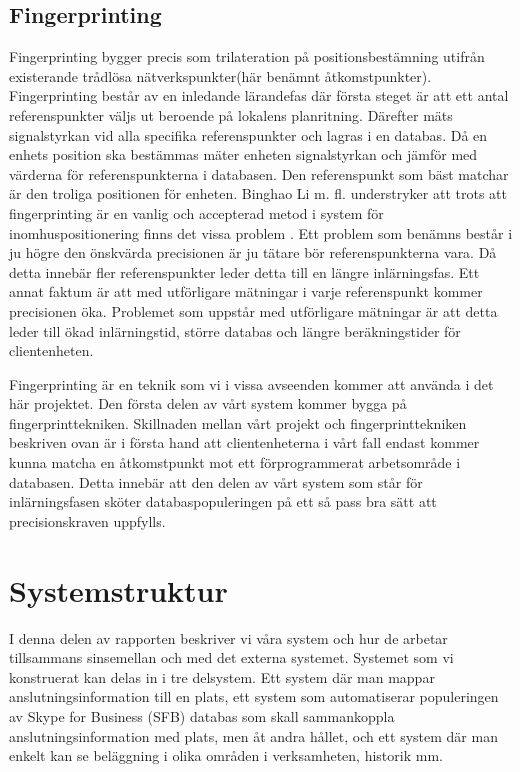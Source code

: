 \documentclass[swedish, a4paper,12pt]{article}
\begin{document}
\subsection{Fingerprinting}
Fingerprinting bygger precis som trilateration på positionsbestämning utifrån existerande trådlösa nätverkspunkter(här benämnt åtkomstpunkter). Fingerprinting består av en inledande lärandefas där första steget är att ett antal referenspunkter väljs ut beroende på lokalens planritning. Därefter mäts signalstyrkan vid alla specifika referenspunkter och lagras i en databas.%
Då en enhets position ska bestämmas mäter enheten signalstyrkan och jämför med värderna för referenspunkterna i databasen. Den referenspunkt som bäst matchar är den troliga positionen för enheten.\cite{IP1}\cite{jun2018low}
Binghao Li m. fl. understryker att trots att fingerprinting är en vanlig och accepterad metod i system för inomhuspositionering finns det vissa problem .\cite{IP1}
Ett problem som benämns består i ju högre den önskvärda precisionen är ju tätare bör referenspunkterna vara. Då detta innebär fler referenspunkter leder detta till en längre inlärningsfas. Ett annat faktum är att med utförligare mätningar i varje referenspunkt kommer precisionen öka. Problemet som uppstår med utförligare mätningar är att detta leder till ökad inlärningstid, större databas och längre beräkningstider för clientenheten.\cite{IP1}

Fingerprinting är en teknik som vi i vissa avseenden kommer att använda i det här projektet. Den första delen av vårt system kommer bygga på fingerprinttekniken. Skillnaden mellan vårt projekt och fingerprinttekniken beskriven ovan är i första hand att clientenheterna i vårt fall endast kommer kunna matcha en åtkomstpunkt mot ett förprogrammerat arbetsområde i databasen. Detta innebär att den delen av vårt system som står för inlärningsfasen sköter databaspopuleringen på ett så pass bra sätt att precisionskraven uppfylls.


\section{Systemstruktur}
I denna delen av rapporten beskriver vi våra system och hur de arbetar tillsammans sinsemellan och med det externa systemet.
Systemet som vi konstruerat kan delas in i tre delsystem. Ett system där man mappar anslutningsinformation till en plats, ett system som automatiserar populeringen av Skype for Business (SFB) databas som skall sammankoppla anslutningsinformation med plats, men åt andra hållet, och ett system där man enkelt kan se beläggning i olika områden i verksamheten, historik mm.
\end{document}
